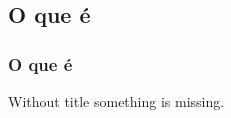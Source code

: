 \documentclass[hyperref={pdfpagelabels=false}]{beamer}
\begin{document}
        \subsection{O que é}
        
             \begin{frame}\frametitle{O que é}

                Without title something is missing.

            \end{frame}
\end{document}
